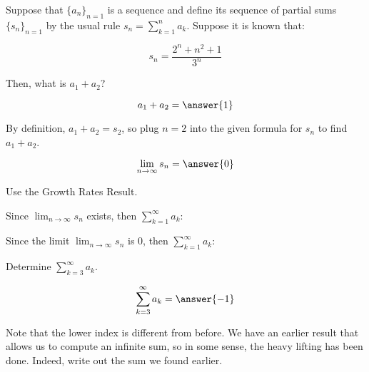 \documentclass{ximera}
\author{Jim Talamo}
\begin{document}
\begin{exercise}
Suppose that $\{a_n\}_{n=1}$ is a sequence and define its sequence of partial sums $\{s_n\}_{n=1}$ by the usual rule $s_n = \sum_{k=1}^n a_k$.  Suppose it is known that:

\[
s_n = \frac{2^n+n^2+1}{3^n}
\]

Then, what is $a_1+a_2$?

\[
a_1+a_2= \answer{1}
\]
\begin{hint}
By definition, $a_1+a_2 = s_2$, so plug $n=2$ into the given formula for $s_n$ to find $a_1+a_2$.
\end{hint}
\begin{exercise}
\[
\lim_{n \to \infty} s_n = \answer{0}
\]
\begin{hint}
Use the Growth Rates Result.
\end{hint}
\begin{exercise}
Since $\lim_{n \to \infty} s_n$ exists, then $\sum_{k=1}^{\infty} a_k$:


\begin{multipleChoice}
\end{multipleChoice}

Since the limit $\lim_{n \to \infty} s_n$ is $0$, then $\sum_{k=1}^{\infty} a_k$:
\begin{multipleChoice}
\end{multipleChoice}

\begin{exercise}
Determine $\sum_{k=3}^{\infty} a_k$.

\[
\sum_{k=3}^{\infty} a_k = \answer{-1}
\]

\begin{hint}
Note that the lower index is different from before.  We have an earlier result that allows us to compute an infinite sum, so in some sense, the heavy lifting has been done.  Indeed, write out the sum we found earlier.
\begin{image}
  \end{image}
\end{hint}


\end{exercise}
\end{exercise}
\end{exercise}
\end{exercise}
\end{document}
